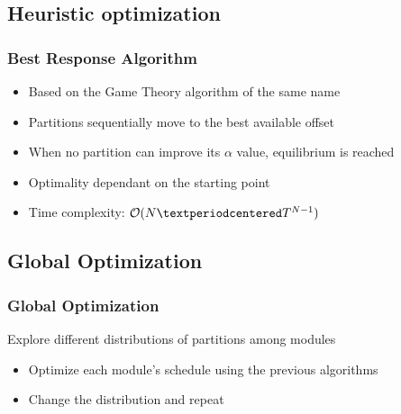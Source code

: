 \documentclass[english, frametitlelogo, mainlogoleft, handout]{beamer}
\begin{document}
\subsection{Heuristic optimization}

\begin{frame}
    \frametitle{Best Response Algorithm \cite{al2012strictly}}

    \begin{itemize}
        \item<1-> Based on the Game Theory algorithm of the same name
        \item<2-> Partitions sequentially move to the best available offset
        \item<3-> When no partition can improve its $α$ value, equilibrium is reached
        \item<4-> Optimality dependant on the starting point
        \item<5-> Time complexity: $\bigO(N·T^{N-1})$
    \end{itemize}

    \vfill

    {\centering\resizebox{0.95\linewidth}{!}{}}
\end{frame}

\subsection{Global Optimization}

\begin{frame}
    \frametitle{Global Optimization}

    Explore different distributions of partitions among modules
    \begin{itemize}
        \item Optimize each module's schedule using the previous algorithms
        \item Change the distribution and repeat
    \end{itemize}
\end{frame}
\end{document}
